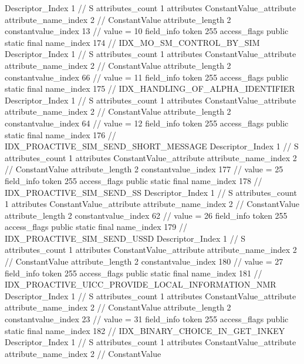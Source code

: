 {{{{{				Descriptor_Index	1		// S
				attributes_count	1
				attributes {
				ConstantValue_attribute {
					attribute_name_index	2		// ConstantValue
					attribute_length	2
					constantvalue_index	13		// value = 10
				}
				}
			}
			field_info {
				token	255
				access_flags	public static final
				name_index	174		// IDX_MO_SM_CONTROL_BY_SIM
				Descriptor_Index	1		// S
				attributes_count	1
				attributes {
				ConstantValue_attribute {
					attribute_name_index	2		// ConstantValue
					attribute_length	2
					constantvalue_index	66		// value = 11
				}
				}
			}
			field_info {
				token	255
				access_flags	public static final
				name_index	175		// IDX_HANDLING_OF_ALPHA_IDENTIFIER
				Descriptor_Index	1		// S
				attributes_count	1
				attributes {
				ConstantValue_attribute {
					attribute_name_index	2		// ConstantValue
					attribute_length	2
					constantvalue_index	64		// value = 12
				}
				}
			}
			field_info {
				token	255
				access_flags	public static final
				name_index	176		// IDX_PROACTIVE_SIM_SEND_SHORT_MESSAGE
				Descriptor_Index	1		// S
				attributes_count	1
				attributes {
				ConstantValue_attribute {
					attribute_name_index	2		// ConstantValue
					attribute_length	2
					constantvalue_index	177		// value = 25
				}
				}
			}
			field_info {
				token	255
				access_flags	public static final
				name_index	178		// IDX_PROACTIVE_SIM_SEND_SS
				Descriptor_Index	1		// S
				attributes_count	1
				attributes {
				ConstantValue_attribute {
					attribute_name_index	2		// ConstantValue
					attribute_length	2
					constantvalue_index	62		// value = 26
				}
				}
			}
			field_info {
				token	255
				access_flags	public static final
				name_index	179		// IDX_PROACTIVE_SIM_SEND_USSD
				Descriptor_Index	1		// S
				attributes_count	1
				attributes {
				ConstantValue_attribute {
					attribute_name_index	2		// ConstantValue
					attribute_length	2
					constantvalue_index	180		// value = 27
				}
				}
			}
			field_info {
				token	255
				access_flags	public static final
				name_index	181		// IDX_PROACTIVE_UICC_PROVIDE_LOCAL_INFORMATION_NMR
				Descriptor_Index	1		// S
				attributes_count	1
				attributes {
				ConstantValue_attribute {
					attribute_name_index	2		// ConstantValue
					attribute_length	2
					constantvalue_index	23		// value = 31
				}
				}
			}
			field_info {
				token	255
				access_flags	public static final
				name_index	182		// IDX_BINARY_CHOICE_IN_GET_INKEY
				Descriptor_Index	1		// S
				attributes_count	1
				attributes {
				ConstantValue_attribute {
					attribute_name_index	2		// ConstantValue
}}}}}}}
